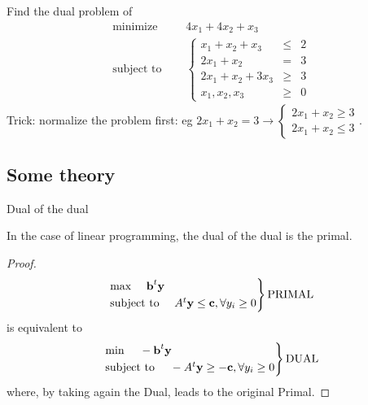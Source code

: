 \documentclass[c]{beamer}
\begin{document}

\begin{frame}{}
\begin{Exercise}
  Find the dual problem of
  \begin{equation*}
  \begin{aligned}
    \text{minimize } \quad & 4x_1 +4x_2+x_3 \\
    \text{subject to }\quad &
    \left\{
    \begin{array}{rcl}
      x_1+x_2+x_3 &\leq &2 \\
      2x_1+x_2 &= &3 \\
      2x_1+x_2+3x_3 &\geq &3 \\
      x_1,x_2,x_3 &\geq& 0
    \end{array}
    \right.
  \end{aligned}
\end{equation*}
Trick: normalize the problem first: eg $2x_1+x_2=3 \rightarrow \begin{cases}2x_1+x_2 \geq 3\\2x_1+x_2\leq 3\end{cases}$.
\end{Exercise}
\end{frame}

\subsection{Some theory}

\begin{frame}{Dual of the dual}
\begin{theorem}
  In the case of linear programming, the dual of the dual is the primal.
\end{theorem}
\begin{proof}
 \[
\begin{rcases}
\text{max }\quad\textbf{b}^t \textbf{y}\\
\text{subject to }\quad A^t\textbf{y}\leq \textbf{c}, \forall y_i\geq0
\end{rcases} \text{PRIMAL}
\]
is equivalent to
\[
\begin{rcases}
\text{min }\quad-\textbf{b}^t \textbf{y}\\
\text{subject to }\quad -A^t\textbf{y}\geq -\textbf{c}, \forall y_i\geq0
\end{rcases} \text{DUAL}
\]
where, by taking again the Dual, leads to the original Primal.
\end{proof}
\end{frame}
\end{document}
